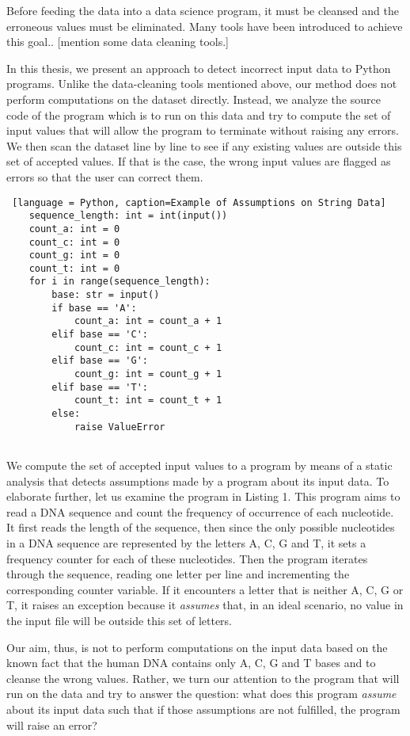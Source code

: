 \documentclass[10pt]{report}
\begin{document}
Before feeding the data into a data science program, it must be cleansed and the erroneous values must be eliminated. Many tools have been introduced to achieve this goal.. [mention some data cleaning tools.] 

In this thesis, we present an approach to detect incorrect input data to Python programs. Unlike the data-cleaning tools mentioned above, our method does not perform computations on the dataset directly. Instead, we analyze the source code of the program which is to run on this data and try to compute the set of input values that will allow the program to terminate without raising any errors.  We then scan the dataset line by line to see if any existing values are outside this set of accepted values. If that is the case, the wrong input values are flagged as errors so that the user can correct them.  

\begin{lstlisting} [language = Python, caption=Example of Assumptions on String Data] 
	sequence_length: int = int(input())
	count_a: int = 0
	count_c: int = 0
	count_g: int = 0
	count_t: int = 0
	for i in range(sequence_length):
		base: str = input()
		if base == 'A':
			count_a: int = count_a + 1
		elif base == 'C':
			count_c: int = count_c + 1
		elif base == 'G':
			count_g: int = count_g + 1
		elif base == 'T':
			count_t: int = count_t + 1
		else:
			raise ValueError
			
\end{lstlisting} 

We compute the set of accepted input values to a program by means of a static analysis that detects assumptions made by a program about its input data. To elaborate further, let us examine the program in Listing 1. This program aims to read a DNA sequence and count the frequency of occurrence of each nucleotide. It first reads the length of the sequence, then since the only possible nucleotides in a DNA sequence are represented by the letters A, C, G and T, it sets a frequency counter for each of these nucleotides. Then the program iterates through the sequence, reading one letter per line and incrementing the corresponding counter variable. If it encounters a letter that is neither A, C, G or T, it raises an exception because it \textit{assumes} that, in an ideal scenario, no value in the input file will be outside this set of letters. 

Our aim, thus, is not to perform computations on the input data based on the known fact that the human DNA contains only A, C, G and T bases and to cleanse the wrong values. Rather, we turn our attention to the program that will run on the data and try to answer the question: what does this program \textit{assume} about its input data such that if those assumptions are not fulfilled, the program will raise an error?
\end{document}
